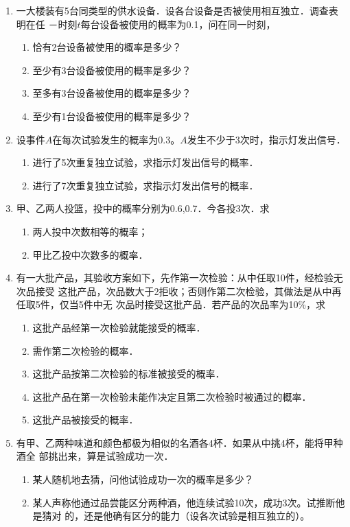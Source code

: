\documentclass[10pt,a4paper]{article}
\begin{document}
\begin{enumerate}
    \item 一大楼装有5台同类型的供水设备．设各台设备是否被使用相互独立．调查表明在任
    －时刻$t$每台设备被使用的概率为0.1，问在同一时刻，
    \begin{enumerate}
        \item 恰有2台设备被使用的概率是多少？
        \item 至少有3台设备被使用的概率是多少？
        \item 至多有3台设备被使用的概率是多少？
        \item 至少有1台设备被使用的概率是多少？
    \end{enumerate}


    \item 设事件$A$在每次试验发生的概率为0.3。$A$发生不少于3次时，指示灯发出信号．
    \begin{enumerate}
        \item 进行了5次重复独立试验，求指示灯发出信号的概率．
        \item 进行了7次重复独立试验，求指示灯发出信号的概率．
    \end{enumerate}


    \item 甲、乙两人投篮，投中的概率分别为0.6,0.7．今各投3次．求
    \begin{enumerate}
        \item 两人投中次数相等的概率；
        \item 甲比乙投中次数多的概率．
    \end{enumerate}


    \item 有一大批产品，其验收方案如下，先作第一次检验：从中任取10件，经检验无次品接受
    这批产品，次品数大于2拒收；否则作第二次检验，其做法是从中再任取5件，仅当5件中无
    次品时接受这批产品．若产品的次品率为10\%，求
    \begin{enumerate}
        \item 这批产品经第一次检验就能接受的概率．
        \item 需作第二次检验的概率．
        \item 这批产品按第二次检验的标准被接受的概率．
        \item 这批产品在第一次检验未能作决定且第二次检验时被通过的概率．
        \item 这批产品被接受的概率．
    \end{enumerate}


    \item 有甲、乙两种味道和颜色都极为相似的名酒各4杯．如果从中挑4杯，能将甲种酒全
    部挑出来，算是试验成功一次．
    \begin{enumerate}
        \item 某人随机地去猜，问他试验成功一次的概率是多少？
        \item 某人声称他通过品尝能区分两种酒，他连续试验10次，成功3次。试推断他是猜对
        的，还是他确有区分的能力（设各次试验是相互独立的）。 
    \end{enumerate}



\end{enumerate}
\end{document}
